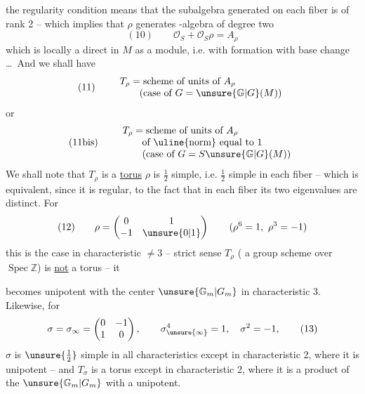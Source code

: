 the regularity condition means that the subalgebra generated on each fiber is of rank 2  -- which implies that $\rho$ generates -algebra of degree two
\[
(10)\qquad \mathcal O_S+\mathcal O_S\rho=A_\rho
\]
which is locally a direct  in $M$ as a module, i.e. with formation  with base change \ldots\ And we shall have
\[
(11)\qquad
\begin{array}{l}
T_\rho=\text{scheme of units of }A_\rho\\
\qquad\text{(case of }G=\unsure{\mathbb G|G}(M)\text{)}
\end{array}
\]
or
\[
(11\text{bis})\qquad
\begin{array}{l}
T_\rho=\text{scheme of units of }A_\rho\\
\qquad\text{of \uline{norm} equal to }1\\
\qquad\text{(case of }G=S\unsure{\mathbb G|G}(M)\text{)}
\end{array}
\]
We shall note that $T_\rho$ is a \uline{torus}   $\rho$ is $\frac{1}{2}$ simple, i.e. $\frac{1}{2}$ simple in each fiber -- which is equivalent, since it is regular, to the fact that in each fiber its two eigenvalues are distinct. For
\[
(12)\qquad \rho=\begin{pmatrix}0&1\\-1&\unsure{0|1}\end{pmatrix}\qquad (\rho^6=1,\ \rho^3=-1)
\]
this is  the case in characteristic $\ne 3$ --   strict sense $T_\rho$ ( a group scheme over $\operatorname{Spec}\mathbb Z$) is \uline{not} a torus -- it


becomes   unipotent with the center $\unsure{\mathbb G_m|G_m}$ in characteristic 3. Likewise, for
\[
\sigma=\sigma_\infty=\begin{pmatrix}0&-1\\1&0\end{pmatrix},\qquad
\sigma_{\unsure{\infty}}^4=1,\quad\sigma^2=-1,
\tag{13}
\]
$\sigma$ is $\unsure{\frac12}$ simple in all characteristics except in characteristic 2,
where it is unipotent -- and $T_\sigma$ is a
torus except in characteristic 2, where it  is
a product of the  $\unsure{\mathbb G_m|G_m}$ with a unipotent.

